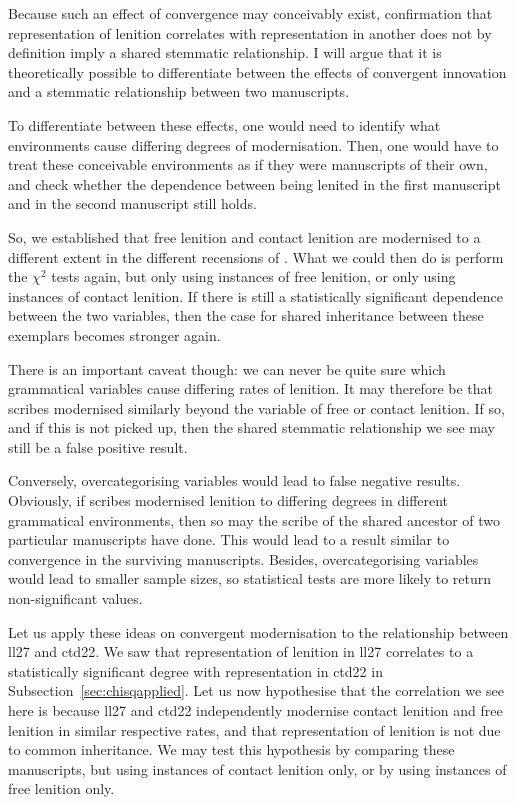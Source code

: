 Because such an effect of convergence may conceivably exist, confirmation that representation of lenition  correlates with representation in another does not by definition imply a shared stemmatic relationship. I will argue that it is theoretically possible to differentiate between the effects of convergent innovation and a stemmatic relationship between two manuscripts.

To differentiate between these effects, one would need to identify what environments cause differing degrees of modernisation. Then, one would have to treat these conceivable environments as if they were manuscripts of their own, and check whether the dependence between being lenited in the first manuscript and in the second manuscript still holds.

So, we established that free lenition and contact lenition are modernised to a different extent in the different recensions of . What we could then do is perform the \(\chi^2\) tests again, but only using instances of free lenition, or only using instances of contact lenition. If there is still a statistically significant dependence between the two variables, then the case for shared inheritance between these exemplars becomes stronger again.

There is an important caveat though: we can never be quite sure which grammatical variables cause differing rates of lenition. It may therefore be that scribes modernised similarly beyond the variable of free or contact lenition. If so, and if this is not picked up, then the shared stemmatic relationship we see may still be a false positive result.

Conversely, overcategorising variables would lead to false negative results. Obviously, if scribes modernised lenition to differing degrees in different grammatical environments, then so may the scribe of the shared ancestor of two particular manuscripts have done. This would lead to a result similar to convergence in the surviving manuscripts. Besides, overcategorising variables would lead to smaller sample sizes, so statistical tests are more likely to return non-significant values.

Let us apply these ideas on convergent modernisation to the relationship between \gls{ll27} and \gls{ctd22}. We saw that representation of lenition in \gls{ll27} correlates to a statistically significant degree with representation in \gls{ctd22} in Subsection~\ref{sec:chisqapplied}. Let us now hypothesise that the correlation we see here is because \gls{ll27} and \gls{ctd22} independently modernise contact lenition and free lenition in similar respective rates, and that representation of lenition is not due to common inheritance. We may test this hypothesis by comparing these manuscripts, but using instances of contact lenition only, or by using instances of free lenition only. 

